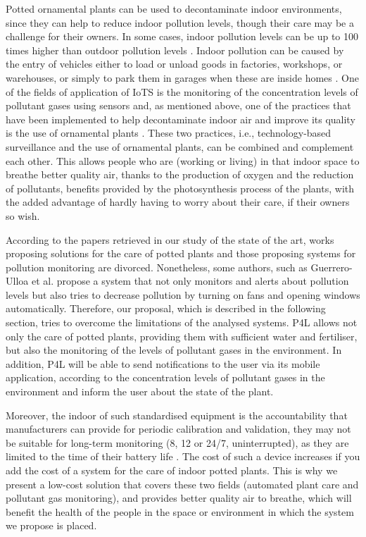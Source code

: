 \documentclass[12pt,a4paper,oneside,english]{book}
\begin{document}
Potted ornamental plants can be used to decontaminate indoor environments, since they can help to reduce indoor pollution levels, though their care may be a challenge for their owners. In some cases, indoor pollution levels can be up to 100 times higher than outdoor pollution levels \citep{johannessen2020embedded}. Indoor pollution can be caused by the entry of vehicles either to load or unload goods in factories, workshops, or warehouses, or simply to park them in garages when these are inside homes \citep{brunel2019two}. One of the fields of application of IoTS is the monitoring of the concentration levels of pollutant gases using sensors \citep{guerrero2023development,gezici2022systematic,guerrero2023agile} and, as mentioned above, one of the practices that have been implemented to help decontaminate indoor air and improve its quality is the use of ornamental plants \citep{chowdhury2021effects,barra2022artificial,kumar2022probabilistic}. These two practices, i.e., technology-based surveillance and the use of ornamental plants, can be combined and complement each other. This allows people who are (working or living) in that indoor space to breathe better quality air, thanks to the production of oxygen and the reduction of pollutants, benefits provided by the photosynthesis process of the plants, with the added advantage of hardly having to worry about their care, if their owners so wish.

According to the papers retrieved in our study of the state of the art, works proposing solutions for the care of potted plants and those proposing systems for pollution monitoring are divorced. Nonetheless, some authors, such as Guerrero-Ulloa et al. \citep{guerrero2020smartmedicine} propose a system that not only monitors and alerts about pollution levels but also tries to decrease pollution by turning on fans and opening windows automatically. Therefore, our proposal, which is described in the following section, tries to overcome the limitations of the analysed systems. P4L allows not only the care of potted plants, providing them with sufficient water and fertiliser, but also the monitoring of the levels of pollutant gases in the environment. In addition, P4L will be able to send notifications to the user via its mobile application, according to the concentration levels of pollutant gases in the environment and inform the user about the state of the plant.

Moreover, the indoor of such standardised equipment is the accountability that manufacturers can provide for periodic calibration and validation, they may not be suitable for long-term monitoring (8, 12 or 24/7, uninterrupted), as they are limited to the time of their battery life \citep{yang2021long}. The cost of such a device increases if you add the cost of a system for the care of indoor potted plants. This is why we present a low-cost solution that covers these two fields (automated plant care and pollutant gas monitoring), and provides better quality air to breathe, which will benefit the health of the people in the space or environment in which the system we propose is placed.
\end{document}
